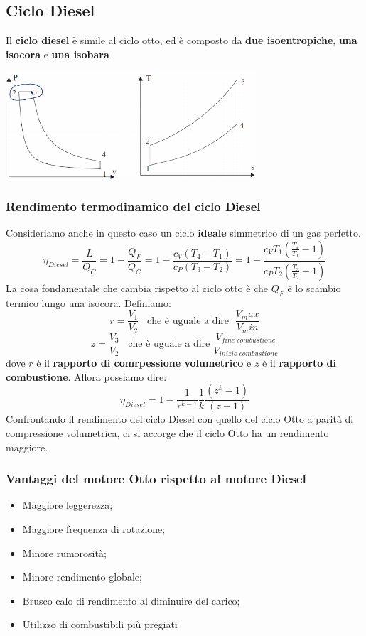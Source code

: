 \subsection{Ciclo Diesel}
Il \textbf{ciclo diesel} è simile al ciclo otto, ed è composto da \textbf{due isoentropiche}, \textbf{una isocora} e \textbf{una isobara}
\begin{center}
    \includegraphics[height=4cm]{../L07/img13.PNG}
\end{center}
\subsubsection{Rendimento termodinamico del ciclo Diesel}
Consideriamo anche in questo caso un ciclo \textbf{ideale} simmetrico di un gas perfetto.
\[
    \eta_{Diesel} = \frac{L}{Q_C} = 1- \frac{Q_F}{Q_C} = 1- \frac{c_V(T_4-T_1)}{c_P(T_3-T_2)} = 1- \frac{c_V T_1\left(\frac{T_4}{T_1}-1\right)}{c_P T_2 \left(\frac{T_3}{T_2}-1\right)}
\]
La cosa fondamentale che cambia rispetto al ciclo otto è che $Q_F$ è lo scambio termico lungo una isocora.\newline
Definiamo:
\[
    r = \frac{V_1}{V_2} \;\;\;\text{che è uguale a dire }\; \frac{V_max}{V_min}
\]
\[
    z = \frac{V_3}{V_2} \;\;\;\text{che è uguale a dire}\; \frac{V_{fine \; combustione}}{V_{inizio \; combustione}}
\]
dove $r$ è il \textbf{rapporto di comrpessione volumetrico} e $z$ è il \textbf{rapporto di combustione}.\newline
Allora possiamo dire:
\[
    \eta_{Diesel} = 1- \frac{1}{r^{k-1}} \frac{1}{k} \frac{(z^k -1)}{(z-1)}
\]
Confrontando il rendimento del ciclo Diesel con quello del ciclo Otto a parità di compressione volumetrica, ci si accorge che il ciclo Otto ha un rendimento maggiore.
\subsubsection{Vantaggi del motore Otto rispetto al motore Diesel}
\begin{itemize}
    \item Maggiore leggerezza;
    \item Maggiore frequenza di rotazione;
    \item Minore rumorosità;
    \item Minore rendimento globale;
    \item Brusco calo di rendimento al diminuire del carico;
    \item Utilizzo di combustibili più pregiati
\end{itemize}
